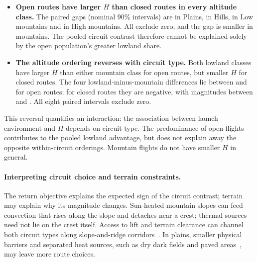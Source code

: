 \begin{itemize}
 \item \textbf{Open routes have larger $H$ than closed routes in every
 altitude class.} The paired gaps (nominal 90\% intervals) are
 \ChThreeTaskGapPlains{} in Plains, \ChThreeTaskGapHills{} in Hills,
 \ChThreeTaskGapLow{} in Low mountains and \ChThreeTaskGapHigh{} in High mountains.
 All exclude zero, and the gap is smaller in mountains. The pooled circuit contrast therefore cannot
 be explained solely by the open population's greater lowland share.
 \item \textbf{The altitude ordering reverses with circuit type.}
 Both lowland classes have larger $H$ than either mountain class for open
 routes, but smaller $H$ for closed routes. The four lowland-minus-mountain
 differences lie between \ChThreeOpenAltShiftMin{} and
 \ChThreeOpenAltShiftMax{} for open routes; for closed routes they are
 negative, with magnitudes between \ChThreeClosedAltShiftMin{} and
 \ChThreeClosedAltShiftMax. All eight paired intervals exclude zero.
\end{itemize}
This reversal quantifies an interaction: the association between launch
environment and $H$ depends on circuit type. The predominance of open flights
contributes to the pooled lowland advantage, but does not explain away the
opposite within-circuit orderings. Mountain flights do not have smaller $H$
in general.

\paragraph{Interpreting circuit choice and terrain constraints.}
The return objective explains the expected sign of the circuit contrast;
terrain may explain why its magnitude changes. Sun-heated mountain slopes
can feed convection that rises along the slope and detaches near a crest;
thermal sources need not lie on the crest itself. Access to lift and terrain
clearance can channel both circuit types along slope-and-ridge
corridors~\cite[Chapters~9--10]{faa_glider2024}. In plains, smaller physical
barriers and separated heat sources, such as dry dark fields and paved
areas~\cite{ssa_lift_sources}, may leave more route choices.

